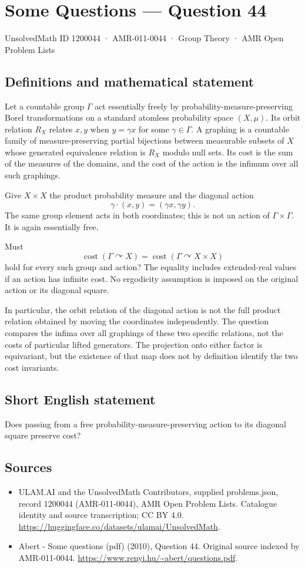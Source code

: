 \documentclass[11pt,a4paper]{article}
\begin{document}
\section*{Some Questions — Question 44}\label{1200044}
{\small UnsolvedMath ID 1200044 · AMR-011-0044 · Group Theory · AMR Open Problem Lists}
\subsection{Definitions and mathematical statement}
Let a countable group $\Gamma$ act essentially freely by probability-measure-preserving Borel transformations on a standard atomless probability space $(X,\mu)$. Its orbit relation $R_X$ relates $x,y$ when $y=\gamma x$ for some $\gamma\in\Gamma$. A graphing is a countable family of measure-preserving partial bijections between measurable subsets of $X$ whose generated equivalence relation is $R_X$ modulo null sets. Its cost is the sum of the measures of the domains, and the cost of the action is the infimum over all such graphings.

Give $X\times X$ the product probability measure and the diagonal action
\[
 \gamma\cdot(x,y)=(\gamma x,\gamma y).
\]
The same group element acts in both coordinates; this is not an action of $\Gamma\times\Gamma$. It is again essentially free.

Must
\[
 \operatorname{cost}(\Gamma\curvearrowright X)
 =\operatorname{cost}(\Gamma\curvearrowright X\times X)
\]
hold for every such group and action? The equality includes extended-real values if an action has infinite cost. No ergodicity assumption is imposed on the original action or its diagonal square.

In particular, the orbit relation of the diagonal action is not the full product relation obtained by moving the coordinates independently. The question compares the infima over all graphings of these two specific relations, not the costs of particular lifted generators. The projection onto either factor is equivariant, but the existence of that map does not by definition identify the two cost invariants.
\subsection{Short English statement}
Does passing from a free probability-measure-preserving action to its diagonal square preserve cost?
\subsection{Sources}
\begin{itemize}
\item[S1] ULAM.AI and the UnsolvedMath Contributors, supplied problems.json, record 1200044 (AMR-011-0044), AMR Open Problem Lists. Catalogue identity and source transcription; CC BY 4.0.
\url{https://huggingface.co/datasets/ulamai/UnsolvedMath}.
\item[S2] Abert - Some questions (pdf) (2010), Question 44. Original source indexed by AMR-011-0044.
\url{https://www.renyi.hu/~abert/questions.pdf}.
\end{itemize}
\end{document}

